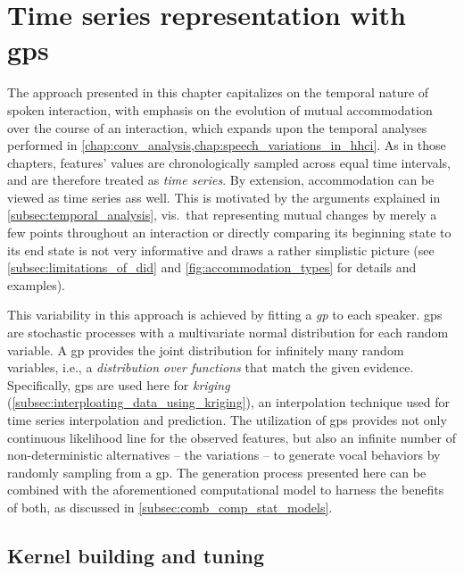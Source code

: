 \section{Time series representation with \aclp{gp}}
\label{sec:time_series_analysis}

The approach presented in this chapter capitalizes on the temporal nature of spoken interaction, with emphasis on the evolution of mutual accommodation over the course of an interaction, which expands upon the temporal analyses performed in \cref{chap:conv_analysis,chap:speech_variations_in_hhci}.
As in those chapters, features' values are chronologically sampled across equal time intervals, and are therefore treated as \emph{time series}.
By extension, accommodation can be viewed as time series ass well.
This is motivated by the arguments explained in \cref{subsec:temporal_analysis}, vis.\ that representing mutual changes by merely a few points throughout an interaction or directly comparing its beginning state to its end state is not very informative and draws a rather simplistic picture (see \cref{subsec:limitations_of_did} and \cref{fig:accommodation_types} for details and examples).

This variability in this approach is achieved by fitting a \emph{\ac{gp}} to each speaker.
\Acp{gp} are stochastic processes with a multivariate normal distribution for each random variable.
A \ac{gp} provides the joint distribution for infinitely many random variables, i.e., a \emph{distribution over functions} that match the given evidence.
Specifically, \acp{gp} are used here for \emph{kriging} (\cref{subsec:interploating_data_using_kriging}), an interpolation technique used for time series interpolation and prediction.
The utilization of \acp{gp} provides not only continuous likelihood line for the observed features, but also an infinite number of non-deterministic alternatives -- the variations -- to generate vocal behaviors by randomly sampling from a \ac{gp}.
The generation process presented here can be combined with the aforementioned computational model to harness the benefits of both, as discussed in \cref{subsec:comb_comp_stat_models}.

\subsection{Kernel building and tuning}
\label{subsec:covariance_functions}

